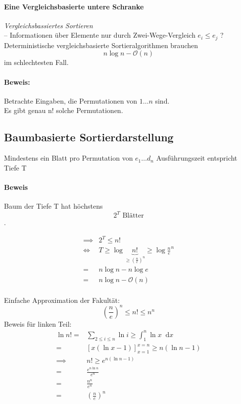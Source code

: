 \documentclass[a4paper]{scrartcl}
\newcommand*\dif{\mathop{}\!\mathrm{d}}
\begin{document}
			\paragraph{Eine Vergleichsbasierte untere Schranke} 
			\emph{Vergleichsbassiertes Sortieren}\\
			-- Informationen über Elemente nur durch Zwei-Wege-Vergleich \( e_i \leq e_j \) ?\\
			Deterministische vergleichsbasierte Sortieralgorithmen brauchen \[ n \log n - \mathcal{O} (n) \] im schlechtesten Fall.\\
			
			\paragraph{Beweis:}
			Betrachte Eingaben, die Permutationen von \( 1 \dots n \) sind.\\
			Es gibt genau n! solche Permutationen.
			
		\subsection{Baumbasierte Sortierdarstellung} 
		Mindestens ein Blatt pro Permutation von \( e_1 \dots d_n \) Ausführungszeit entspricht Tiefe T\\
		
		\paragraph{Beweis} 
		Baum der Tiefe T hat höchstens \[ 2^{T} \text{ Blätter} \].
		
		\begin{align*}
			\implies & 2^T \leq n!\\
			\iff & T \geq \log \underbrace{n!}_{\geq (\frac{n}{e})^n} \geq \log \frac{n}{e}^n\\
			=& n \log n - n \log e \\
			=&n \log n - \mathcal{O}(n)\\
		\end{align*}
		
		Einfache Approximation der Fakultät: \[ (\frac{n}{e})^n \leq n! \leq n^n \]
		Beweis für linken Teil:\\
		\begin{align*}
			\ln n! =& \sum_{2 \leq i \leq n} \ln i \geq \int_{1}^{n} \ln x \dif x\\
			=& [x(\ln x - 1)]^{x=n}_{x=1} \geq n(\ln n - 1)\\
			\implies & n! \geq e^{n(\ln n-1)} \\
			=& \frac{e^{n \ln n}}{e^n}\\
			=& \frac{n^n}{e^n} \\
			=& (\frac{n}{e})^n\\
		\end{align*}
	
\end{document}
